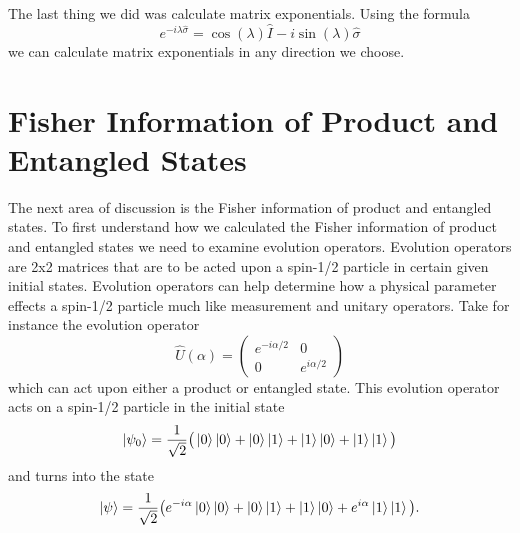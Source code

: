 \documentclass[twocolumn]{article}
\begin{document}
The last thing we did was calculate matrix exponentials. Using the formula
\begin{equation}
e^{-i\lambda\hat{\sigma}}=\cos{(\lambda)}\hat{I}-i\sin{(\lambda)}\hat{\sigma}
\end{equation}
we can calculate matrix exponentials in any direction we choose.
\section*{Fisher Information of Product and Entangled States}
The next area of discussion is the Fisher information of product and entangled states. To first understand how we calculated the Fisher information of product and entangled states we need to examine evolution operators. Evolution operators are 2x2 matrices that are to be acted upon a spin-1/2 particle in certain given initial states. Evolution operators can help determine how a physical parameter effects a spin-1/2 particle much like measurement and unitary operators. Take for instance the evolution operator
\begin{equation}
\hat{U}(\alpha)=
\begin{pmatrix}
e^{-i\alpha/2} & 0 \\
0 & e^{i\alpha/2}
\end{pmatrix}
\end{equation}
which can act upon either a product or entangled state. This evolution operator acts on a spin-1/2 particle in the initial state
\begin{equation}
\ket{\psi_0}=\frac{1}{\sqrt{2}}\big(\ket{0}\ket{0}+\ket{0}\ket{1}+\ket{1}\ket{0}+\ket{1}\ket{1}\big)
\end{equation}
and turns into the state
\begin{equation}
\ket{\psi}=\frac{1}{\sqrt{2}}\big(e^{-i\alpha}\ket{0}\ket{0}+\ket{0}\ket{1}+\ket{1}\ket{0}+e^{i\alpha}\ket{1}\ket{1}\big).
\end{equation}
\end{document}
